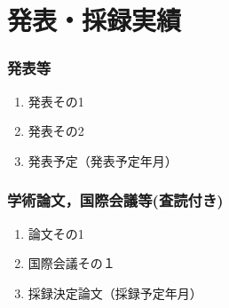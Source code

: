 \chapter*{発表・採録実績}
\thispagestyle{plain}


\subsection*{発表等}
\begin{enumerate}
\renewcommand{\labelenumi}{[\arabic{enumi}]}
    \item 発表その1
    \item 発表その2
    \item 発表予定（発表予定年月）
\end{enumerate}

\subsection*{学術論文，国際会議等(査読付き)}
\begin{enumerate}
\renewcommand{\labelenumi}{[\arabic{enumi}]}
    \item 論文その1
    \item 国際会議その１
    \item 採録決定論文（採録予定年月）
\end{enumerate}